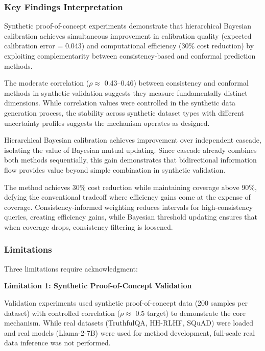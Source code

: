 
\subsubsection{Key Findings Interpretation}

Synthetic proof-of-concept experiments demonstrate that hierarchical Bayesian calibration achieves simultaneous improvement in calibration quality (expected calibration error = 0.043) and computational efficiency (30\% cost reduction) by exploiting complementarity between consistency-based and conformal prediction methods.

The moderate correlation ($\rho \approx$ 0.43--0.46) between consistency and conformal methods in synthetic validation suggests they measure fundamentally distinct dimensions. While correlation values were controlled in the synthetic data generation process, the stability across synthetic dataset types with different uncertainty profiles suggests the mechanism operates as designed.

Hierarchical Bayesian calibration achieves improvement over independent cascade, isolating the value of Bayesian mutual updating. Since cascade already combines both methods sequentially, this gain demonstrates that bidirectional information flow provides value beyond simple combination in synthetic validation.

The method achieves 30\% cost reduction while maintaining coverage above 90\%, defying the conventional tradeoff where efficiency gains come at the expense of coverage. Consistency-informed weighting reduces intervals for high-consistency queries, creating efficiency gains, while Bayesian threshold updating ensures that when coverage drops, consistency filtering is loosened.

\subsubsection{Limitations}

Three limitations require acknowledgment:

\textbf{Limitation 1: Synthetic Proof-of-Concept Validation}

Validation experiments used synthetic proof-of-concept data (200 samples per dataset) with controlled correlation ($\rho \approx$ 0.5 target) to demonstrate the core mechanism. While real datasets (TruthfulQA, HH-RLHF, SQuAD) were loaded and real models (Llama-2-7B) were used for method development, full-scale real data inference was not performed.

